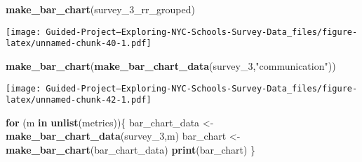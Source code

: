 \documentclass[]{article}
\newenvironment{Shaded}{\begin{snugshade}}{\end{snugshade}}
\newcommand{\ControlFlowTok}[1]{\textcolor[rgb]{0.13,0.29,0.53}{\textbf{#1}}}
\newcommand{\DataTypeTok}[1]{\textcolor[rgb]{0.13,0.29,0.53}{#1}}
\newcommand{\DecValTok}[1]{\textcolor[rgb]{0.00,0.00,0.81}{#1}}
\newcommand{\KeywordTok}[1]{\textcolor[rgb]{0.13,0.29,0.53}{\textbf{#1}}}
\newcommand{\NormalTok}[1]{#1}
\newcommand{\OperatorTok}[1]{\textcolor[rgb]{0.81,0.36,0.00}{\textbf{#1}}}
\newcommand{\OtherTok}[1]{\textcolor[rgb]{0.56,0.35,0.01}{#1}}
\newcommand{\StringTok}[1]{\textcolor[rgb]{0.31,0.60,0.02}{#1}}
\begin{document}
\begin{Shaded}
\begin{Highlighting}[]
\KeywordTok{make_bar_chart}\NormalTok{(survey_}\DecValTok{3}\NormalTok{_rr_grouped)}
\end{Highlighting}
\end{Shaded}

\texttt{[image: Guided-Project--Exploring-NYC-Schools-Survey-Data\_files/figure-latex/unnamed-chunk-40-1.pdf]}

\begin{Shaded}
\end{Shaded}

\begin{Shaded}
\begin{Highlighting}[]
\KeywordTok{make_bar_chart}\NormalTok{(}\KeywordTok{make_bar_chart_data}\NormalTok{(survey_}\DecValTok{3}\NormalTok{,}\StringTok{"communication"}\NormalTok{))}
\end{Highlighting}
\end{Shaded}

\texttt{[image: Guided-Project--Exploring-NYC-Schools-Survey-Data\_files/figure-latex/unnamed-chunk-42-1.pdf]}

\begin{Shaded}
\begin{Highlighting}[]
\ControlFlowTok{for}\NormalTok{ (m }\ControlFlowTok{in} \KeywordTok{unlist}\NormalTok{(metrics))\{}
\NormalTok{  bar_chart_data <-}\StringTok{ }\KeywordTok{make_bar_chart_data}\NormalTok{(survey_}\DecValTok{3}\NormalTok{,m)}
\NormalTok{  bar_chart <-}\StringTok{ }\KeywordTok{make_bar_chart}\NormalTok{(bar_chart_data)}
  \KeywordTok{print}\NormalTok{(bar_chart)}
\NormalTok{\}}
\end{Highlighting}
\end{Shaded}
\end{document}
